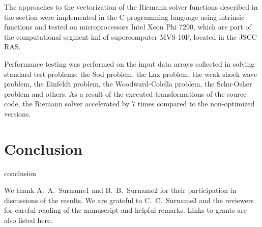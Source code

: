 \documentclass[
11pt,%
tightenlines,%
twoside,%
onecolumn,%
nofloats,%
nobibnotes,%
nofootinbib,%
superscriptaddress,%
noshowpacs,%
centertags]%
{revtex4}
\begin{document}
The approaches to the vectorization of the Riemann solver functions described in the section were implemented in the C programming language using intrinsic functions and tested on microprocessors Intel Xeon Phi 7290, which are part of the computational segment knl of supercomputer MVS-10P, located in the JSCC RAS.

Performance testing was performed on the input data arrays collected in solving standard test problems: the Sod problem, the Lax problem, the weak shock wave problem, the Einfeldt problem, the Woodward-Colella problem, the Schu-Osher problem and others.
As a result of the executed transformations of the source code, the Riemann solver accelerated by 7 times compared to the non-optimized versions.

\section{Conclusion}

conclusion

\begin{acknowledgments}
We thank A.~A.~Surname1 and B.~B.~Surname2 for their participation in discussions of the results. We are grateful to C.~C.~Surname3 and the reviewers for careful reading of the manuscript and helpful remarks. Links to grants are also listed here.
\end{acknowledgments}
\end{document}
